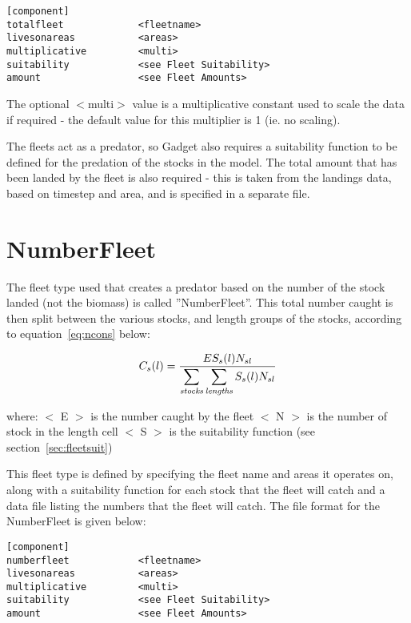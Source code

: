 \documentclass[10pt,twoside]{book}
\begin{document}
{\small\begin{verbatim}
[component]
totalfleet             <fleetname>
livesonareas           <areas>
multiplicative         <multi>
suitability            <see Fleet Suitability>
amount                 <see Fleet Amounts>
\end{verbatim}}

The optional $<$multi$>$ value is a multiplicative constant used to scale the data if required - the default value for this multiplier is 1 (ie. no scaling).

\bigskip
The fleets act as a predator, so Gadget also requires a suitability function to be defined for the predation of the stocks in the model.  The total amount that has been landed by the fleet is also required - this is taken from the landings data, based on timestep and area, and is specified in a separate file.

\section{NumberFleet}\label{sec:numberfleet}
The fleet type used that creates a predator based on the number of the stock landed (not the biomass) is called ''NumberFleet''.  This total number caught is then split between the various stocks, and length groups of the stocks, according to equation~\ref{eq:ncons} below:

\begin{equation}\label{eq:ncons}
C_{s}(l) = \frac{E S_{s}(l) N_{sl}}{\displaystyle \sum_{\it stocks} \sum_{\it lengths} S_{s}(l) N_{sl}}
\end{equation}

where:\newline
$<$ E $>$ is the number caught by the fleet\newline
$<$ N $>$ is the number of stock in the length cell\newline
$<$ S $>$ is the suitability function (see section~\ref{sec:fleetsuit})

\bigskip
This fleet type is defined by specifying the fleet name and areas it operates on, along with a suitability function for each stock that the fleet will catch and a data file listing the numbers that the fleet will catch.  The file format for the NumberFleet is given below:

{\small\begin{verbatim}
[component]
numberfleet            <fleetname>
livesonareas           <areas>
multiplicative         <multi>
suitability            <see Fleet Suitability>
amount                 <see Fleet Amounts>
\end{verbatim}}
\end{document}
